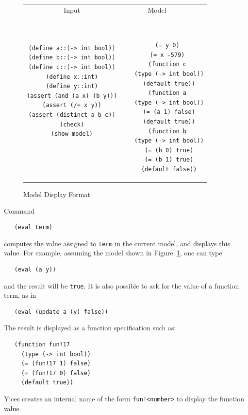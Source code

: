\documentclass[11pt,twoside,fleqn,openright,titlepage]{cslreport}
\begin{document}
\begin{figure}
\begin{footnotesize}
\begin{center}
\begin{tabular}{c|c}
\multicolumn{1}{c}{Input} & \multicolumn{1}{c}{Model~~~~} \\[0.4em]

\begin{minipage}[c]{6cm}
\begin{verbatim}
(define a::(-> int bool))
(define b::(-> int bool))
(define c::(-> int bool))
(define x::int)
(define y::int)
(assert (and (a x) (b y)))
(assert (/= x y))
(assert (distinct a b c))
(check)
(show-model)
\end{verbatim}
\end{minipage}~~
&
~~~\begin{minipage}[c]{6cm}
\begin{verbatim}
  (= y 0)
  (= x -579)
  (function c
   (type (-> int bool))
   (default true))
  (function a
   (type (-> int bool))
   (= (a 1) false)
   (default true))
  (function b
   (type (-> int bool))
   (= (b 0) true)
   (= (b 1) true)
   (default false))
\end{verbatim}
\end{minipage}
\end{tabular}
\end{center}
\end{footnotesize}
\caption{Model Display Format}
\label{model-format}
\end{figure}


\medskip\noindent
Command
\begin{small}
\begin{verbatim}
   (eval term)
\end{verbatim}
\end{small}
computes the value assigned to \texttt{term} in the current model,
and displays this value. For example, assuming the model shown in
Figure~\ref{model-format}, one can type
\begin{small}
\begin{verbatim}
   (eval (a y))
\end{verbatim}
\end{small}
and the result will be \texttt{true}. It is also possible to ask for
the value of a function term, as in
\begin{small}
\begin{verbatim}
   (eval (update a (y) false))
\end{verbatim}
\end{small}
The result is displayed as a function specification such as:
\begin{small}
\begin{verbatim}
   (function fun!17
     (type (-> int bool))
     (= (fun!17 1) false)
     (= (fun!17 0) false)
     (default true))
\end{verbatim}
\end{small}
Yices creates an internal name of the form \texttt{fun!<number>} to
display the function value.
\end{document}
